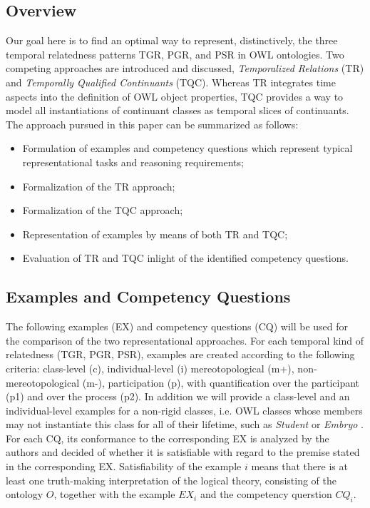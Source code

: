 \subsection*{Overview}

Our goal here is to find an optimal way to represent, distinctively, the three temporal relatedness patterns TGR, PGR, and PSR in OWL ontologies. 
Two competing approaches are introduced and discussed, \emph{Temporalized Relations} (TR) and \emph{Temporally Qualified Continuants} (TQC). Whereas TR integrates time 
aspects into the definition of OWL object properties, TQC provides a way to model all instantiations of continuant classes as temporal slices of continuants. 
The approach pursued in this paper can be summarized as follows:

\begin{itemize}
\item
Formulation of examples and competency questions which represent typical representational tasks and reasoning requirements; 
\item
Formalization of the TR approach;
\item 
Formalization of the TQC approach;
\item 
Representation of examples by means of both TR and TQC; 
\item 
Evaluation of TR and TQC inlight of the identified competency questions. 

\end{itemize}


\subsection*{Examples and Competency Questions}
 
The following examples (EX) and competency questions (CQ) will be used for the comparison of the two representational approaches. 
For each temporal kind of relatedness (TGR, PGR, PSR), examples are created according to the following criteria:  
class-level (c), individual-level (i) mereotopological (m+), non-mereotopological (m-), participation (p), 
with quantification over the participant (p1) and over the process (p2).  
In addition we will provide a class-level and an individual-level examples for a non-rigid classes, i.e. OWL classes whose members may not instantiate this class for all of their lifetime, such as \emph{Student} or \emph{Embryo} \cite{OntoClean}. 
For each CQ, its conformance to the corresponding EX is analyzed by the authors and decided of whether it is satisfiable with regard to the premise stated in the corresponding EX. Satisfiability of the example $i$ means that there is at least one truth-making interpretation of the logical theory, consisting of the ontology $O$, together with the example $EX_i$ and the competency querstion $CQ_i$.  
 
